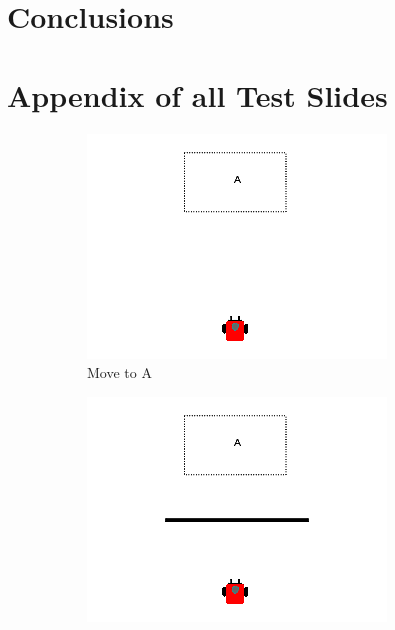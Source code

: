 \documentclass[]{article}
\begin{document}
\section{Conclusions}




\section{Appendix of all Test Slides}
\begin{figure}
	\centering
	\begin{subfigure}{0.42\textwidth}
		\centering
		\includegraphics[width=\linewidth]{slide_images/Swarm_Robot_Control_-_Single_Robot_0003.png}
		\caption{Move to A}
		\label{fig:sub1}
	\end{subfigure}%
	\begin{subfigure}{0.42\textwidth}
		\centering
		\includegraphics[width=\linewidth]{slide_images/Swarm_Robot_Control_-_Single_Robot_0005.png}

\end{subfigure}
\end{figure}
\end{document}
